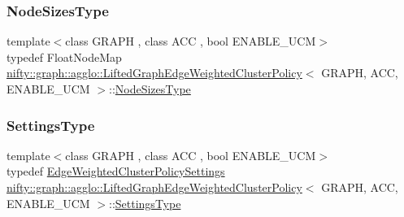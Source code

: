 \mbox{\label{classnifty_1_1graph_1_1agglo_1_1LiftedGraphEdgeWeightedClusterPolicy_aec2d1f0ad4c63bb5847322c094a557cb}} 
\subsubsection{\texorpdfstring{Node\+Sizes\+Type}{NodeSizesType}\hspace{0.1cm}{\footnotesize\ttfamily [2/2]}}
{\footnotesize\ttfamily template$<$class G\+R\+A\+PH , class A\+CC , bool E\+N\+A\+B\+L\+E\+\_\+\+U\+CM$>$ \\
typedef Float\+Node\+Map \hyperlink{classnifty_1_1graph_1_1agglo_1_1LiftedGraphEdgeWeightedClusterPolicy}{nifty\+::graph\+::agglo\+::\+Lifted\+Graph\+Edge\+Weighted\+Cluster\+Policy}$<$ G\+R\+A\+PH, A\+CC, E\+N\+A\+B\+L\+E\+\_\+\+U\+CM $>$\+::\hyperlink{classnifty_1_1graph_1_1agglo_1_1LiftedGraphEdgeWeightedClusterPolicy_aec2d1f0ad4c63bb5847322c094a557cb}{Node\+Sizes\+Type}}

\mbox{\label{classnifty_1_1graph_1_1agglo_1_1LiftedGraphEdgeWeightedClusterPolicy_a9bb055f88e22430364ff7624a17276fe}} 
\subsubsection{\texorpdfstring{Settings\+Type}{SettingsType}}
{\footnotesize\ttfamily template$<$class G\+R\+A\+PH , class A\+CC , bool E\+N\+A\+B\+L\+E\+\_\+\+U\+CM$>$ \\
typedef \hyperlink{structnifty_1_1graph_1_1agglo_1_1EdgeWeightedClusterPolicySettings}{Edge\+Weighted\+Cluster\+Policy\+Settings} \hyperlink{classnifty_1_1graph_1_1agglo_1_1LiftedGraphEdgeWeightedClusterPolicy}{nifty\+::graph\+::agglo\+::\+Lifted\+Graph\+Edge\+Weighted\+Cluster\+Policy}$<$ G\+R\+A\+PH, A\+CC, E\+N\+A\+B\+L\+E\+\_\+\+U\+CM $>$\+::\hyperlink{structnifty_1_1graph_1_1agglo_1_1LiftedGraphEdgeWeightedClusterPolicy_1_1SettingsType}{Settings\+Type}}



